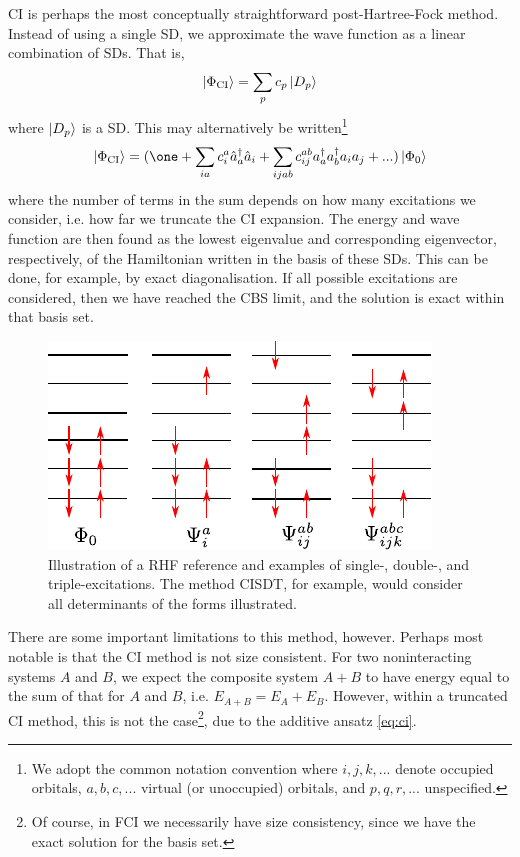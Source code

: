 \Gls{CI} is perhaps the most conceptually straightforward post-Hartree-Fock method. Instead of using a single \gls{SD}, we approximate the wave function as a linear combination of \glspl{SD}. That is,
\begin{equation}
\ket{\Phi_\mathrm{CI}} = \sum_p c_p\ket{D_p}
\end{equation}
where $\ket{D_p}$ is a \gls{SD}. This may alternatively be written\footnote{We adopt the common notation convention where $i,j,k,...$ denote occupied orbitals, $a,b,c,...$ virtual (or unoccupied) orbitals, and $p,q,r, ...$ unspecified.}
\begin{equation}
\label{eq:ci}
\ket{\Phi_\mathrm{CI}} = (\one + \sum_{ia}c_i^a\hat a_a^\dag\hat a_i +
\sum_{ijab}c_{ij}^{ab} a_a^\dag a_b^\dag a_i a_j+...)\ket{\Phi_0}
\end{equation}
where the number of terms in the sum depends on how many excitations we consider, i.e. how far we truncate the \gls{CI} expansion. The energy and wave function are then found as the lowest eigenvalue and corresponding eigenvector, respectively, of the Hamiltonian written in the basis of these \glspl{SD}. This can be done, for example, by exact diagonalisation. If all possible excitations are considered, then we have reached the \gls{CBS} limit, and the solution is exact within that basis set.

\begin{figure}[htbp]
    \centering
    \includegraphics{figures/intro/configurations.pdf}
    \caption{Illustration of a \gls{RHF} reference and examples of single-, double-, and triple-excitations. The method CISDT, for example, would consider all determinants of the forms illustrated.}
    \label{fig:excitations}
\end{figure}

There are some important limitations to this method, however. Perhaps most notable is that the \gls{CI} method is not size consistent. For two noninteracting systems $A$ and $B$, we expect the composite system $A+B$ to have energy equal to the sum of that for $A$ and $B$, i.e. $E_{A+B}=E_A+E_B$. However, within a truncated \gls{CI} method, this is not the case\footnote{Of course, in \gls{FCI} we necessarily have size consistency, since we have the exact solution for the basis set.}, due to the additive ansatz \ref{eq:ci}.

